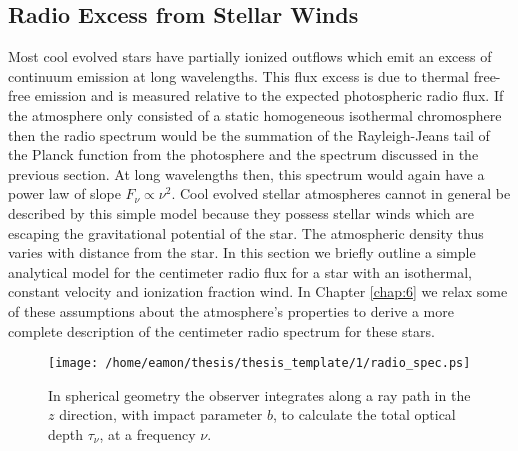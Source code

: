\subsection{Radio Excess from Stellar Winds}\label{sec:1.8.4}
Most cool evolved stars have partially ionized outflows which emit an excess of continuum emission at long wavelengths. This flux excess is due to thermal free-free emission and is measured relative to the expected photospheric radio flux. If the atmosphere only consisted of a static homogeneous isothermal chromosphere then the radio spectrum would be the summation of the Rayleigh-Jeans tail of the Planck function from the photosphere and the  spectrum discussed in the previous section. At long wavelengths then, this spectrum would again have a power law of slope $F_{\nu} \propto \nu ^{2}$. Cool evolved stellar atmospheres cannot in general be described by this simple model because they possess stellar winds which are escaping the gravitational potential of the star. The atmospheric density thus varies with distance from the star. In this section we briefly outline a simple analytical model for the centimeter radio flux for a star with an isothermal, constant velocity and ionization fraction wind. In Chapter \ref{chap:6} we relax some of these assumptions about the atmosphere's properties to derive a more complete description of the centimeter radio spectrum for these stars.

\begin{figure}[hbt!]\label{fig:1.5.4}
\centering 
          \texttt{[image: /home/eamon/thesis/thesis\_template/1/radio\_spec.ps]}
\caption[Schematic for stellar wind radio emission excess]{In spherical geometry the observer integrates along a ray path in the $z$ direction, with impact parameter $b$, to calculate the total optical depth $\tau _{\nu}$, at a frequency $\nu$.}
\label{fig:1.5.4}
\end{figure}

